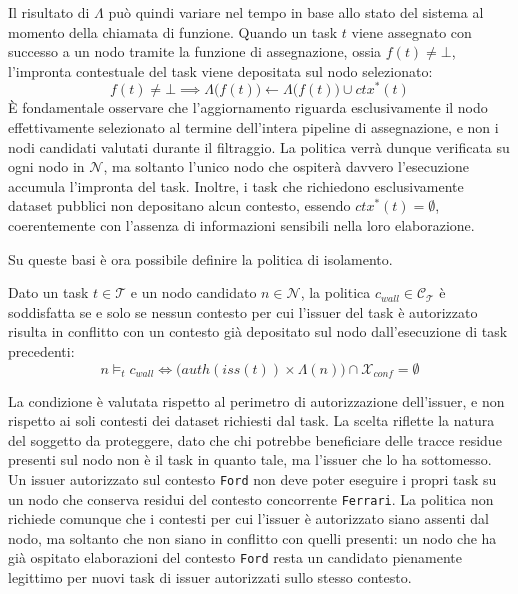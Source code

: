 Il risultato di $\Lambda$ può quindi variare nel tempo in base allo stato del sistema al momento della chiamata di funzione. Quando un task $t$ viene assegnato con successo a un nodo tramite la funzione di assegnazione, ossia $f(t) \neq \bot$, l'impronta contestuale del task viene depositata sul nodo selezionato:
\begin{equation}
    \label{eq:aggiornamento_lambda_wall}
    f(t) \neq \bot \implies \Lambda\bigl(f(t)\bigr) \leftarrow \Lambda\bigl(f(t)\bigr) \cup ctx^*(t)
\end{equation}
È fondamentale osservare che l'aggiornamento riguarda esclusivamente il nodo effettivamente selezionato al termine dell'intera pipeline di assegnazione, e non i nodi candidati valutati durante il filtraggio. La politica verrà dunque verificata su ogni nodo in $\mathcal{N}$, ma soltanto l'unico nodo che ospiterà davvero l'esecuzione accumula l'impronta del task. Inoltre, i task che richiedono esclusivamente dataset pubblici non depositano alcun contesto, essendo $ctx^*(t) = \emptyset$, coerentemente con l'assenza di informazioni sensibili nella loro elaborazione.

Su queste basi è ora possibile definire la politica di isolamento.

\begin{policy}
    \label{pol:c_wall}
    Dato un task $t \in \mathcal{T}$ e un nodo candidato $n \in \mathcal{N}$, la politica $c_{wall} \in \mathcal{C_T}$ è soddisfatta se e solo se nessun contesto per cui l'issuer del task è autorizzato risulta in conflitto con un contesto già depositato sul nodo dall'esecuzione di task precedenti:
    \begin{equation}
        n \models_t c_{wall}
        \iff
        \bigl( auth(iss(t)) \times \Lambda(n) \bigr) \cap \mathcal{X}_{conf} = \emptyset
    \end{equation}
\end{policy}

La condizione è valutata rispetto al perimetro di autorizzazione dell'issuer, e non rispetto ai soli contesti dei dataset richiesti dal task. La scelta riflette la natura del soggetto da proteggere, dato che chi potrebbe beneficiare delle tracce residue presenti sul nodo non è il task in quanto tale, ma l'issuer che lo ha sottomesso. Un issuer autorizzato sul contesto \texttt{Ford} non deve poter eseguire i propri task su un nodo che conserva residui del contesto concorrente \texttt{Ferrari}. La politica non richiede comunque che i contesti per cui l'issuer è autorizzato siano assenti dal nodo, ma soltanto che non siano in conflitto con quelli presenti: un nodo che ha già ospitato elaborazioni del contesto \texttt{Ford} resta un candidato pienamente legittimo per nuovi task di issuer autorizzati sullo stesso contesto.

